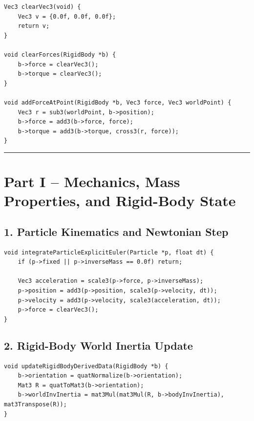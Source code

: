 \documentclass[10pt,letterpaper]{article}
\begin{document}
\begin{verbatim}
Vec3 clearVec3(void) {
    Vec3 v = {0.0f, 0.0f, 0.0f};
    return v;
}

void clearForces(RigidBody *b) {
    b->force = clearVec3();
    b->torque = clearVec3();
}

void addForceAtPoint(RigidBody *b, Vec3 force, Vec3 worldPoint) {
    Vec3 r = sub3(worldPoint, b->position);
    b->force = add3(b->force, force);
    b->torque = add3(b->torque, cross3(r, force));
}
\end{verbatim}

\medskip\hrule\medskip

\clearpage
\section*{Part I -- Mechanics, Mass Properties, and Rigid-Body State}

\subsection*{1. Particle Kinematics and Newtonian Step}

\begin{verbatim}
void integrateParticleExplicitEuler(Particle *p, float dt) {
    if (p->fixed || p->inverseMass == 0.0f) return;

    Vec3 acceleration = scale3(p->force, p->inverseMass);
    p->position = add3(p->position, scale3(p->velocity, dt));
    p->velocity = add3(p->velocity, scale3(acceleration, dt));
    p->force = clearVec3();
}
\end{verbatim}

\subsection*{2. Rigid-Body World Inertia Update}

\begin{verbatim}
void updateRigidBodyDerivedData(RigidBody *b) {
    b->orientation = quatNormalize(b->orientation);
    Mat3 R = quatToMat3(b->orientation);
    b->worldInvInertia = mat3Mul(mat3Mul(R, b->bodyInvInertia), mat3Transpose(R));
}
\end{verbatim}
\end{document}
